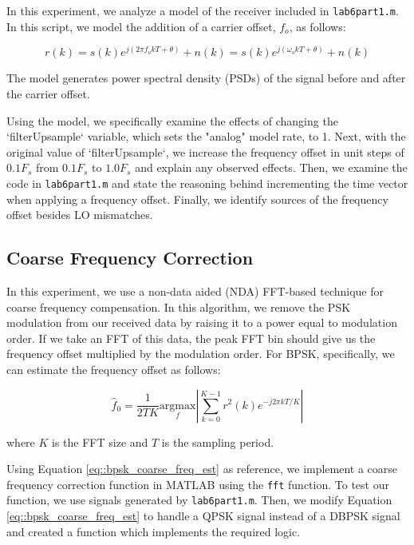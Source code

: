 \documentclass{article}
\begin{document}
In this experiment, we analyze a model of the receiver included in \texttt{lab6part1.m}. In this script, we model the addition of a carrier offset, $f_o$, as follows:

\begin{equation}
	r(k) = s(k)e^{j(2{\pi}f_okT+\theta)}+n(k) = s(k)e^{j(\omega_okT+\theta)}+n(k)
\end{equation}

\noindent The model generates power spectral density (PSDs) of the signal before and after the carrier offset.

Using the model, we specifically examine the effects of changing the `filterUpsample` variable, which sets the "analog" model rate, to 1. Next, with the original value of `filterUpsample`, we increase the frequency offset in unit steps of $0.1F_s$ from $0.1F_s$ to $1.0F_s$ and explain any observed effects. Then, we examine the code in \texttt{lab6part1.m} and state the reasoning behind incrementing the time vector when applying a frequency offset. Finally, we identify sources of the frequency offset besides LO mismatches.

\subsection{Coarse Frequency Correction}

In this experiment, we use a non-data aided (NDA) FFT-based technique for coarse frequency compensation. In this algorithm, we remove the PSK modulation from our received data by raising it to a power equal to modulation order. If we take an FFT of this data, the peak FFT bin should give us the frequency offset multiplied by the modulation order. For BPSK, specifically, we can estimate the frequency offset as follows:

\begin{equation}
	\label{eq::bpsk_coarse_freq_est}	
	\hat{f}_0 = \frac{1}{2TK}\underset{f}{\text{argmax}}\left\vert\sum_{k=0}^{K-1}{r^2(k)e^{-j2{\pi}kT/K}}\right\vert
\end{equation}

\noindent where $K$ is the FFT size and $T$ is the sampling period.

Using Equation \ref{eq::bpsk_coarse_freq_est} as reference, we implement a coarse frequency correction function in MATLAB using the \texttt{fft} function. To test our function, we use signals generated by \texttt{lab6part1.m}. Then, we modify Equation \ref{eq::bpsk_coarse_freq_est} to handle a QPSK signal instead of a DBPSK signal and created a function which implements the required logic.
\end{document}
